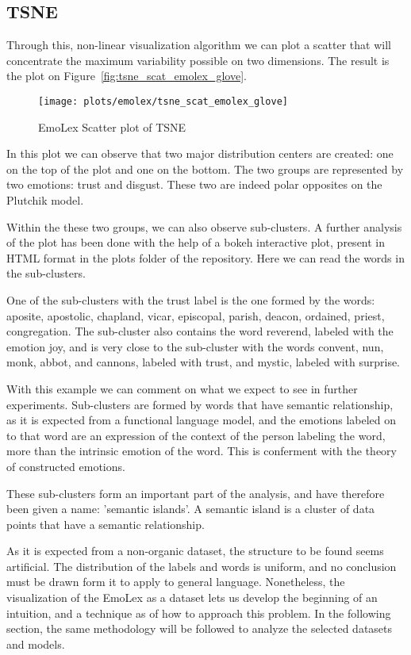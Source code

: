 \subsection{TSNE}
Through this, non-linear visualization algorithm we can plot a scatter that will concentrate the maximum variability possible on two dimensions. The result is the plot on Figure~\ref{fig:tsne_scat_emolex_glove}.

\begin{figure}[H]
  \texttt{[image: plots/emolex/tsne\_scat\_emolex\_glove]}
  \centering
  \caption{EmoLex Scatter plot of TSNE}
\end{figure}\label{fig:tsne_scat_emolex_glove}

In this plot we can observe that two major distribution centers are created: one on the top of the plot and one on the bottom. The two groups are represented by two emotions: trust and disgust. These two are indeed polar opposites on the Plutchik model.

Within the these two groups, we can also observe sub-clusters. A further analysis of the plot has been done with the help of a bokeh interactive plot, present in HTML format in the plots folder of the repository. Here we can read the words in the sub-clusters.

One of the sub-clusters with the trust label is the one formed by the words: aposite, apostolic, chapland, vicar, episcopal, parish, deacon, ordained, priest, congregation. The sub-cluster also contains the word reverend, labeled with the emotion joy, and is very close to the sub-cluster with the words convent, nun, monk, abbot, and cannons, labeled with trust, and mystic, labeled with surprise.

With this example we can comment on what we expect to see in further experiments. Sub-clusters are formed by words that have semantic relationship, as it is expected from a functional language model, and the emotions labeled on to that word are an expression of the context of the person labeling the word, more than the intrinsic emotion of the word. This is conferment with the theory of constructed emotions.

These sub-clusters form an important part of the analysis, and have therefore been given a name: 'semantic islands'. A semantic island is a cluster of data points that have a semantic relationship.

As it is expected from a non-organic dataset, the structure to be found seems artificial. The distribution of the labels and words is uniform, and no conclusion must be drawn form it to apply to general language. Nonetheless, the visualization of the EmoLex as a dataset lets us develop the beginning of an intuition, and a technique as of how to approach this problem. In the following section, the same methodology will be followed to analyze the selected datasets and models.



